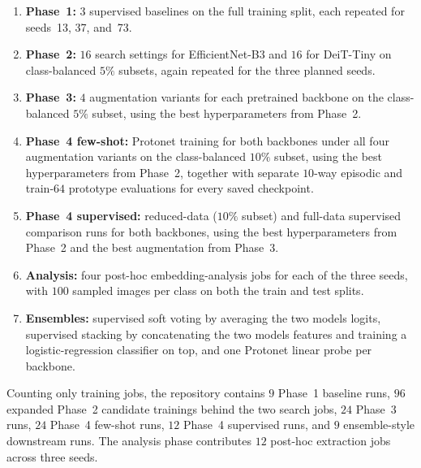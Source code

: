 \documentclass[12pt,a4paper]{article}
\begin{document}
\begin{enumerate}[nosep]
    \item \textbf{Phase~1:} $3$ supervised baselines on the full training split, each repeated for seeds~13, 37, and~73.
    \item \textbf{Phase~2:} $16$ search settings for EfficientNet-B3 and $16$ for DeiT-Tiny on class-balanced $5\%$ subsets, again repeated for the three planned seeds.
    \item \textbf{Phase~3:} $4$ augmentation variants for each pretrained backbone on the class-balanced $5\%$ subset, using the best hyperparameters from Phase~2.
    \item \textbf{Phase~4 few-shot:} Protonet training for both backbones under all four augmentation variants on the class-balanced $10\%$ subset, using the best hyperparameters from Phase~2, together with separate $10$-way episodic and train-$64$ prototype evaluations for every saved checkpoint.
    \item \textbf{Phase~4 supervised:} reduced-data ($10\%$ subset) and full-data supervised comparison runs for both backbones, using the best hyperparameters from Phase~2 and the best augmentation from Phase~3.
    \item \textbf{Analysis:} four post-hoc embedding-analysis jobs for each of the three seeds, with $100$ sampled images per class on both the train and test splits.
    \item \textbf{Ensembles:} supervised soft voting by averaging the two models logits, supervised stacking by concatenating the two models features and training a logistic-regression classifier on top, and one Protonet linear probe per backbone.
\end{enumerate}

Counting only training jobs, the repository contains $9$ Phase~1 baseline runs, $96$ expanded Phase~2 candidate trainings behind the two search jobs, $24$ Phase~3 runs, $24$ Phase~4 few-shot runs, $12$ Phase~4 supervised runs, and $9$ ensemble-style downstream runs. The analysis phase contributes $12$ post-hoc extraction jobs across three seeds.
\end{document}
